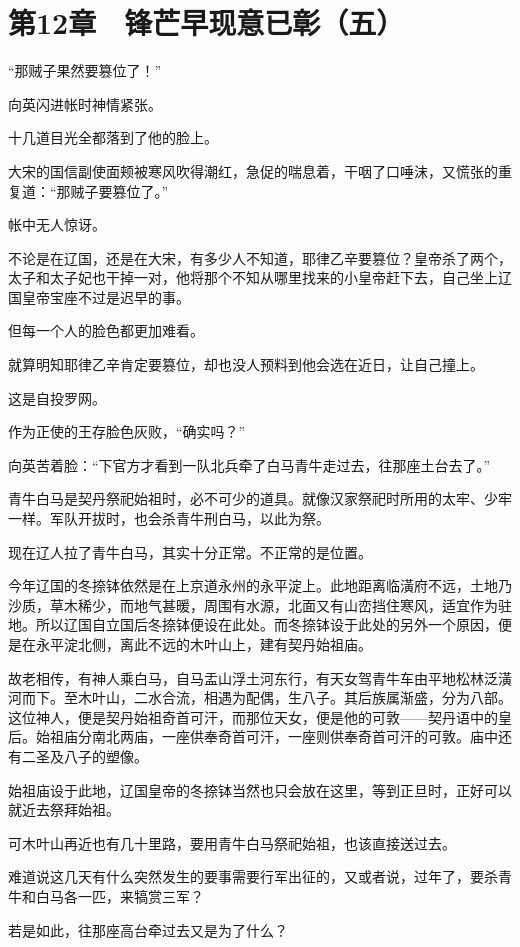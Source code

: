 \section{第12章　锋芒早现意已彰（五）}

“那贼子果然要篡位了！”

向英闪进帐时神情紧张。

十几道目光全都落到了他的脸上。

大宋的国信副使面颊被寒风吹得潮红，急促的喘息着，干咽了口唾沫，又慌张的重复道：“那贼子要篡位了。”

帐中无人惊讶。

不论是在辽国，还是在大宋，有多少人不知道，耶律乙辛要篡位？皇帝杀了两个，太子和太子妃也干掉一对，他将那个不知从哪里找来的小皇帝赶下去，自己坐上辽国皇帝宝座不过是迟早的事。

但每一个人的脸色都更加难看。

就算明知耶律乙辛肯定要篡位，却也没人预料到他会选在近日，让自己撞上。

这是自投罗网。

作为正使的王存脸色灰败，“确实吗？”

向英苦着脸：“下官方才看到一队北兵牵了白马青牛走过去，往那座土台去了。”

青牛白马是契丹祭祀始祖时，必不可少的道具。就像汉家祭祀时所用的太牢、少牢一样。军队开拔时，也会杀青牛刑白马，以此为祭。

现在辽人拉了青牛白马，其实十分正常。不正常的是位置。

今年辽国的冬捺钵依然是在上京道永州的永平淀上。此地距离临潢府不远，土地乃沙质，草木稀少，而地气甚暖，周围有水源，北面又有山峦挡住寒风，适宜作为驻地。所以辽国自立国后冬捺钵便设在此处。而冬捺钵设于此处的另外一个原因，便是在永平淀北侧，离此不远的木叶山上，建有契丹始祖庙。

故老相传，有神人乘白马，自马盂山浮土河东行，有天女驾青牛车由平地松林泛潢河而下。至木叶山，二水合流，相遇为配偶，生八子。其后族属渐盛，分为八部。这位神人，便是契丹始祖奇首可汗，而那位天女，便是他的可敦——契丹语中的皇后。始祖庙分南北两庙，一座供奉奇首可汗，一座则供奉奇首可汗的可敦。庙中还有二圣及八子的塑像。

始祖庙设于此地，辽国皇帝的冬捺钵当然也只会放在这里，等到正旦时，正好可以就近去祭拜始祖。

可木叶山再近也有几十里路，要用青牛白马祭祀始祖，也该直接送过去。

难道说这几天有什么突然发生的要事需要行军出征的，又或者说，过年了，要杀青牛和白马各一匹，来犒赏三军？

若是如此，往那座高台牵过去又是为了什么？

